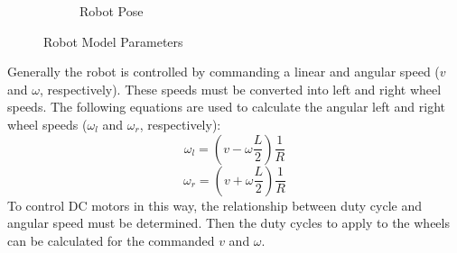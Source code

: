 \begin{figure}
\begin{subfigure}{0.7\textwidth}
        \caption{Robot Pose}
        \label{fig:robotPose}
    \end{subfigure}
    \caption{Robot Model Parameters}
    \label{fig:robotModelParameters}
\end{figure}
%

Generally the robot is controlled by commanding a linear and angular speed ($v$ and $\omega$, respectively). These speeds must be converted into left and right wheel speeds. The following equations are used to calculate the angular left and right wheel speeds ($\omega_l$ and $\omega_r$, respectively):
$$\omega_l = \left(v - \omega\frac{L}{2}\right)\frac{1}{R}$$
$$\omega_r = \left(v + \omega\frac{L}{2}\right)\frac{1}{R}$$
To control DC motors in this way, the relationship between duty cycle and angular speed must be determined. Then the duty cycles to apply to the wheels can be calculated for the commanded $v$ and $\omega$.

